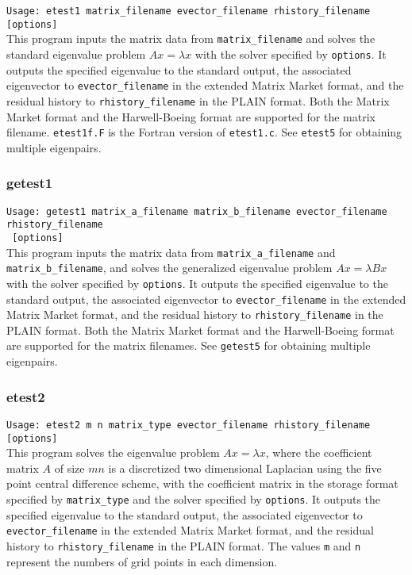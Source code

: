 \documentclass[a4paper]{article}
\begin{document}
\verb+Usage: etest1 matrix_filename evector_filename rhistory_filename [options]+\\

This program inputs the matrix data from {\tt matrix\_filename} and
solves the standard eigenvalue problem $Ax=\lambda x$ with 
the solver specified by {\tt options}. 
It outputs the specified eigenvalue to the standard output, 
the associated eigenvector to {\tt evector\_filename} 
in the extended Matrix Market format, and 
the residual history to {\tt rhistory\_filename} 
in the PLAIN format.
Both the Matrix Market format and the Harwell-Boeing format are
supported for the matrix filename. 
{\tt etest1f.F} is the Fortran version of {\tt etest1.c}.
See {\tt etest5} for obtaining multiple eigenpairs.

\subsubsection{getest1}

\verb+Usage: getest1 matrix_a_filename matrix_b_filename evector_filename rhistory_filename +\\
\verb+ [options]+\\

This program inputs the matrix data from {\tt matrix\_a\_filename}
and {\tt matrix\_b\_filename}, and
solves the generalized eigenvalue problem $Ax=\lambda Bx$ with 
the solver specified by {\tt options}. 
It outputs the specified eigenvalue to the standard output, 
the associated eigenvector to {\tt evector\_filename} 
in the extended Matrix Market format, and 
the residual history to {\tt rhistory\_filename} 
in the PLAIN format.
Both the Matrix Market format and the Harwell-Boeing format are
supported for the matrix filenames. 
See {\tt getest5} for obtaining multiple eigenpairs.

\subsubsection{etest2}

\verb+Usage: etest2 m n matrix_type evector_filename rhistory_filename [options]+\\

This program solves the eigenvalue problem $Ax = \lambda x$, where the 
coefficient matrix $A$ of size $mn$ is a discretized two dimensional Laplacian using the five
point central difference scheme, with the coefficient matrix in the storage format specified
by \verb|matrix_type| and the solver specified by {\tt options}. 
It outputs the specified eigenvalue to the standard output, 
the associated eigenvector to {\tt evector\_filename} in the
extended Matrix Market format, and 
the residual history to {\tt rhistory\_filename} 
in the PLAIN format. 
The values {\tt m} and {\tt n} represent the numbers of grid points
in each dimension. 
\end{document}
